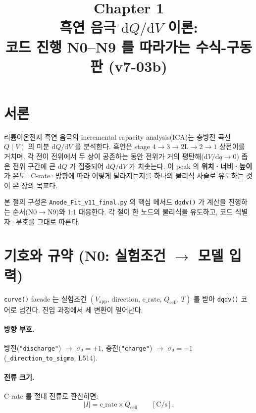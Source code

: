 \documentclass[11pt,a4paper]{article}
\title{\textbf{\LARGE Chapter 1}\\[0.4em]
  \Large 흑연 음극 $\mathrm{d}Q/\mathrm{d}V$ 이론:\\
  코드 진행 N0--N9 를 따라가는 수식-구동판 (v7-03b)}
\author{}
\date{}
\newcommand{\dd}{\mathrm{d}}
\newcommand{\app}{\mathrm{app}}
\newcommand{\cell}{\mathrm{cell}}
\begin{document}
\maketitle

\section*{서론}

리튬이온전지 흑연 음극의 incremental capacity analysis(ICA)는 충방전 곡선 $Q(V)$ 의
미분 $\dd Q/\dd V$ 를 분석한다. 흑연은 stage $4\!\to\!3\!\to\!2\mathrm{L}\!\to\!2\!\to\!1$ 상전이를
거치며, 각 전이 전위에서 두 상이 공존하는 동안 전위가 거의 평탄해($\dd V/\dd q\to0$)
좁은 전위 구간에 큰 $\dd Q$ 가 집중되어 $\dd Q/\dd V$ 가 치솟는다. 이 peak 의
\textbf{위치·너비·높이}가 온도·C-rate·방향에 따라 어떻게 달라지는지를 하나의
물리식 사슬로 유도하는 것이 본 장의 목표다.

본 절의 구성은 \texttt{Anode\_Fit\_v11\_final.py} 의 핵심 메서드 \texttt{dqdv()}
가 계산을 진행하는 순서(N0$\to$N9)와 1:1 대응한다. 각 절이 한 노드의
물리식을 유도하고, 코드 식별자·부호를 그대로 따른다.

\tableofcontents
\newpage

\section{기호와 규약 (N0: 실험조건 $\to$ 모델 입력)}\label{sec:notation}

\texttt{curve()} facade 는 실험조건 $(V_\app,\,\text{direction},\,\text{c\_rate},\,
Q_\cell,\,T)$ 를 받아 \texttt{dqdv()} 코어로 넘긴다. 진입 과정에서 세 변환이 일어난다.

\paragraph{방향 부호.}
방전(\texttt{"discharge"}) $\to$ $\sigma_d=+1$, 충전(\texttt{"charge"}) $\to$
$\sigma_d=-1$ (\texttt{\_direction\_to\_sigma}, L514).

\paragraph{전류 크기.}
C-rate 를 절대 전류로 환산하면:
\begin{equation}
|I| = \text{c\_rate}\times Q_\cell \qquad [\mathrm{C/s}].
\label{eq:iabs}
\end{equation}
\end{document}
